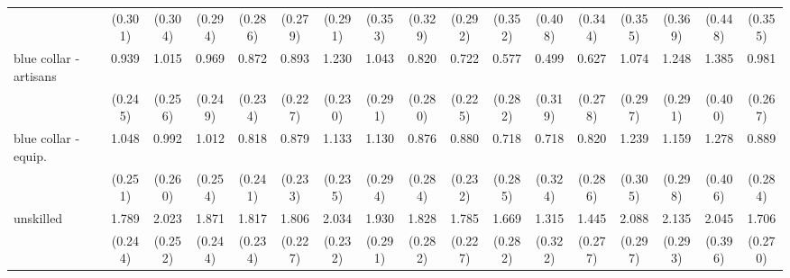 {\begin{tabular}{l*{16}{c}}
                    &     (0.301)         &     (0.304)         &     (0.294)         &     (0.286)         &     (0.279)         &     (0.291)         &     (0.353)         &     (0.329)         &     (0.292)         &     (0.352)         &     (0.408)         &     (0.344)         &     (0.355)         &     (0.369)         &     (0.448)         &     (0.355)         \\
[1em]
blue collar - artisans&       0.939\sym{***}&       1.015\sym{***}&       0.969\sym{***}&       0.872\sym{***}&       0.893\sym{***}&       1.230\sym{***}&       1.043\sym{***}&       0.820\sym{**} &       0.722\sym{**} &       0.577\sym{*}  &       0.499         &       0.627\sym{*}  &       1.074\sym{***}&       1.248\sym{***}&       1.385\sym{***}&       0.981\sym{***}\\
                    &     (0.245)         &     (0.256)         &     (0.249)         &     (0.234)         &     (0.227)         &     (0.230)         &     (0.291)         &     (0.280)         &     (0.225)         &     (0.282)         &     (0.319)         &     (0.278)         &     (0.297)         &     (0.291)         &     (0.400)         &     (0.267)         \\
[1em]
blue collar - equip.&       1.048\sym{***}&       0.992\sym{***}&       1.012\sym{***}&       0.818\sym{***}&       0.879\sym{***}&       1.133\sym{***}&       1.130\sym{***}&       0.876\sym{**} &       0.880\sym{***}&       0.718\sym{*}  &       0.718\sym{*}  &       0.820\sym{**} &       1.239\sym{***}&       1.159\sym{***}&       1.278\sym{**} &       0.889\sym{**} \\
                    &     (0.251)         &     (0.260)         &     (0.254)         &     (0.241)         &     (0.233)         &     (0.235)         &     (0.294)         &     (0.284)         &     (0.232)         &     (0.285)         &     (0.324)         &     (0.286)         &     (0.305)         &     (0.298)         &     (0.406)         &     (0.284)         \\
[1em]
unskilled           &       1.789\sym{***}&       2.023\sym{***}&       1.871\sym{***}&       1.817\sym{***}&       1.806\sym{***}&       2.034\sym{***}&       1.930\sym{***}&       1.828\sym{***}&       1.785\sym{***}&       1.669\sym{***}&       1.315\sym{***}&       1.445\sym{***}&       2.088\sym{***}&       2.135\sym{***}&       2.045\sym{***}&       1.706\sym{***}\\
                    &     (0.244)         &     (0.252)         &     (0.244)         &     (0.234)         &     (0.227)         &     (0.232)         &     (0.291)         &     (0.282)         &     (0.227)         &     (0.282)         &     (0.322)         &     (0.277)         &     (0.297)         &     (0.293)         &     (0.396)         &     (0.270)         \\

\end{tabular}}

